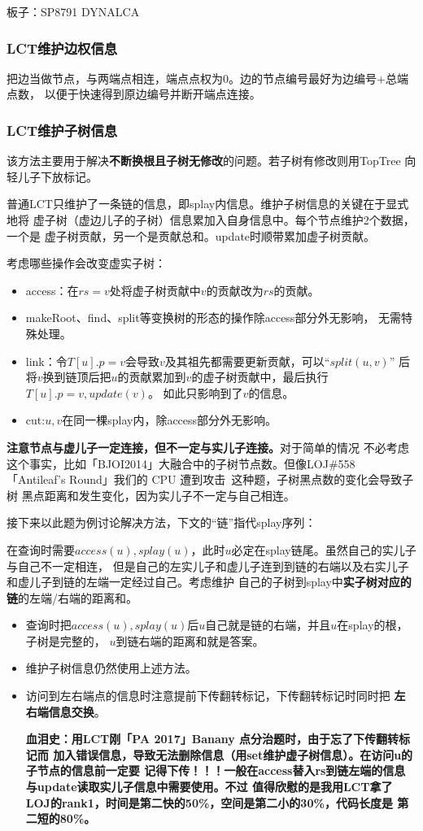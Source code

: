 板子：SP8791 DYNALCA

\subsubsection{LCT维护边权信息}
把边当做节点，与两端点相连，端点点权为0。边的节点编号最好为边编号+总端点数，
以便于快速得到原边编号并断开端点连接。
\subsubsection{LCT维护子树信息}
该方法主要用于解决{\bfseries 不断换根且子树无修改}的问题。若子树有修改则用TopTree
向轻儿子下放标记。

普通LCT只维护了一条链的信息，即splay内信息。维护子树信息的关键在于显式地将
虚子树（虚边儿子的子树）信息累加入自身信息中。每个节点维护2个数据，一个是
虚子树贡献，另一个是贡献总和。update时顺带累加虚子树贡献。

考虑哪些操作会改变虚实子树：
\begin{itemize}
    \item access：在$rs=v$处将虚子树贡献中$v$的贡献改为$rs$的贡献。
    \item makeRoot、find、split等变换树的形态的操作除access部分外无影响，
    无需特殊处理。
    \item link：令$T[u].p=v$会导致$v$及其祖先都需要更新贡献，可以``$split(u,v)$''
    后将$v$换到链顶后把$u$的贡献累加到$v$的虚子树贡献中，最后执行$T[u].p=v,update(v)$。
    如此只影响到了$v$的信息。
    \item cut:$u,v$在同一棵splay内，除access部分外无影响。
\end{itemize}

{\bfseries 注意节点与虚儿子一定连接，但不一定与实儿子连接。}对于简单的情况
不必考虑这个事实，比如「BJOI2014」大融合中的子树节点数。但像LOJ\#558
「Antileaf's Round」我们的 CPU 遭到攻击~这种题，子树黑点数的变化会导致子树
黑点距离和发生变化，因为实儿子不一定与自己相连。

接下来以此题为例讨论解决方法，下文的``链''指代splay序列：

在查询时需要$access(u),splay(u)$，此时$u$必定在splay链尾。虽然自己的实儿子与自己不一定相连，
但是自己的左实儿子和虚儿子连到到链的右端以及右实儿子和虚儿子到链的左端一定经过自己。考虑维护
自己的子树到splay中{\bfseries 实子树对应的链}的左端/右端的距离和。
\begin{itemize}
    \item 查询时把$access(u),splay(u)$后$u$自己就是链的右端，并且$u$在splay的根，子树是完整的，
    $u$到链右端的距离和就是答案。
    \item 维护子树信息仍然使用上述方法。
    \item 访问到左右端点的信息时注意提前下传翻转标记，下传翻转标记时同时把{\bfseries
    左右端信息交换}。

    {\bfseries 血泪史：用LCT刚「PA 2017」Banany 点分治题时，由于忘了下传翻转标记而
    加入错误信息，导致无法删除信息（用set维护虚子树信息）。在访问u的子节点的信息前一定要
    记得下传！！！一般在access替入rs到链左端的信息与update读取实儿子信息中需要使用。不过
    值得欣慰的是我用LCT拿了LOJ的rank1，时间是第二快的50\%，空间是第二小的30\%，代码长度是
    第二短的80\%。}
\end{itemize}

